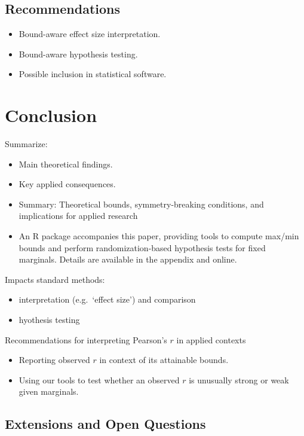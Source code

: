 \documentclass[
  12pt,
]{article}
\providecommand{\tightlist}{%
  \setlength{\itemsep}{0pt}\setlength{\parskip}{0pt}}
\theoremstyle{plain}
\theoremstyle{definition}
\theoremstyle{remark}
\begin{document}
\subsection{Recommendations}\label{recommendations}

\begin{itemize}
\tightlist
\item
  Bound-aware effect size interpretation.
\item
  Bound-aware hypothesis testing.
\item
  Possible inclusion in statistical software.
\end{itemize}

\section{Conclusion}\label{conclusion}

Summarize:

\begin{itemize}
\item
  Main theoretical findings.
\item
  Key applied consequences.
\item
  Summary: Theoretical bounds, symmetry-breaking conditions, and
  implications for applied research
\item
  An R package accompanies this paper, providing tools to compute
  max/min bounds and perform randomization-based hypothesis tests for
  fixed marginals. Details are available in the appendix and online.
\end{itemize}

Impacts standard methods:

\begin{itemize}
\tightlist
\item
  interpretation (e.g.~`effect size') and comparison
\item
  hyothesis testing
\end{itemize}

Recommendations for interpreting Pearson's \(r\) in applied contexts

\begin{itemize}
\tightlist
\item
  Reporting observed \(r\) in context of its attainable bounds.
\item
  Using our tools to test whether an observed \(r\) is unusually strong
  or weak given marginals.
\end{itemize}

\subsection{Extensions and Open
Questions}\label{extensions-and-open-questions}
\end{document}
